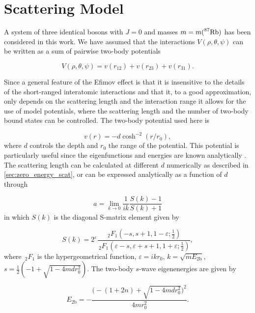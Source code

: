 \chapter{Scattering Model}\label{chapter:scattering_model}
A system of three identical bosons with $J=0$ and masses $m = m( \prescript{87}{}{\mathrm{Rb}})$ has been considered in this work. We have assumed that the interactions $V(\rho,\theta,\psi)$ can be written as a sum of pairwise two-body potentials   

\begin{equation}\label{eq:potential_sum}
V(\rho,\theta,\psi) = v(r_{12}) + v(r_{23}) + v(r_{31}).
\end{equation} 

Since a general feature of the Efimov effect is that it is insensitive to the details of the short-ranged interatomic interactions and that it, to a good approximation, only depends on the scattering length and the interaction range it allows for the use of model potentials, where the scattering length and the number of two-body bound states can be controlled. The two-body potential used here is  

\begin{equation}\label{eq:two_b_potential}
v(r) = -d\cosh^{-2}{(r/r_0)},
\end{equation}
where $d$ controls the depth and $r_0$ the range of the potential. This potential is particularly useful since the eigenfunctions and energies are known analytically \cite{Landau1965Quantum}. The scattering length can be calculated at different $d$ numerically as described in \cref{sec:zero_energy_scat}, or can be expressed analytically as a function of $d$ through 

\begin{equation}
a = \lim_{k \to 0} \frac{1}{ik} \frac{S(k)-1}{S(k)+1}
\end{equation}
in which $S(k)$ is the diagonal S-matrix element given by

\begin{equation}
S(k) = 2^{\varepsilon} \frac{\,_2F_1(-s, s+1, 1-\varepsilon;\frac{1}{2})}{\,_2F_1(\varepsilon-s, \varepsilon + s+1, 1+\varepsilon;\frac{1}{2})},
\end{equation}
where $\,_2F_1$ is the hypergeometrical function, $\varepsilon = ikr_0$, $k = \sqrt{mE_{2\mathrm{b}}}$, $s = \frac{1}{2}(-1 + \sqrt{1-4 m d r_0^2})$. The two-body $s$-wave eigenenergies are given by

\begin{equation}\label{eq:exact_2b}
E_{2\mathrm{b}} = -\frac{\Big(-(1+2n)+\sqrt{1-4mdr_0^2}\Big)^2}{4mr_0^2}.
\end{equation}

